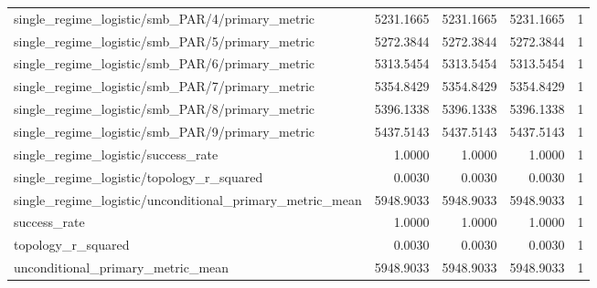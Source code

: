 \begin{table}[h]
\begin{tabular}{lrrrr}
single_regime_logistic/smb_PAR/4/primary_metric & 5231.1665 & 5231.1665 & 5231.1665 & 1 \\
single_regime_logistic/smb_PAR/5/primary_metric & 5272.3844 & 5272.3844 & 5272.3844 & 1 \\
single_regime_logistic/smb_PAR/6/primary_metric & 5313.5454 & 5313.5454 & 5313.5454 & 1 \\
single_regime_logistic/smb_PAR/7/primary_metric & 5354.8429 & 5354.8429 & 5354.8429 & 1 \\
single_regime_logistic/smb_PAR/8/primary_metric & 5396.1338 & 5396.1338 & 5396.1338 & 1 \\
single_regime_logistic/smb_PAR/9/primary_metric & 5437.5143 & 5437.5143 & 5437.5143 & 1 \\
single_regime_logistic/success_rate & 1.0000 & 1.0000 & 1.0000 & 1 \\
single_regime_logistic/topology_r_squared & 0.0030 & 0.0030 & 0.0030 & 1 \\
single_regime_logistic/unconditional_primary_metric_mean & 5948.9033 & 5948.9033 & 5948.9033 & 1 \\
success_rate & 1.0000 & 1.0000 & 1.0000 & 1 \\
topology_r_squared & 0.0030 & 0.0030 & 0.0030 & 1 \\
unconditional_primary_metric_mean & 5948.9033 & 5948.9033 & 5948.9033 & 1 \\
\hline
\end{tabular}
\end{table}